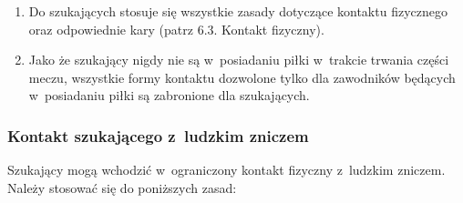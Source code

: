 \documentclass[12pt,a4paper]{article}
\begin{document}
\begin{enumerate}
	\item
	      Do szukających stosuje się wszystkie zasady dotyczące kontaktu
	      fizycznego oraz odpowiednie kary (patrz 6.3. Kontakt fizyczny).
	\item
	      Jako że szukający nigdy nie są w~posiadaniu piłki w~trakcie trwania
	      części meczu, wszystkie formy kontaktu dozwolone tylko dla zawodników
	      będących w~posiadaniu piłki są zabronione dla szukających.
\end{enumerate}

\subsubsection{Kontakt szukającego z~ludzkim zniczem}

Szukający mogą wchodzić w~ograniczony kontakt fizyczny z~ludzkim
zniczem. Należy stosować się do poniższych zasad:
\end{document}
